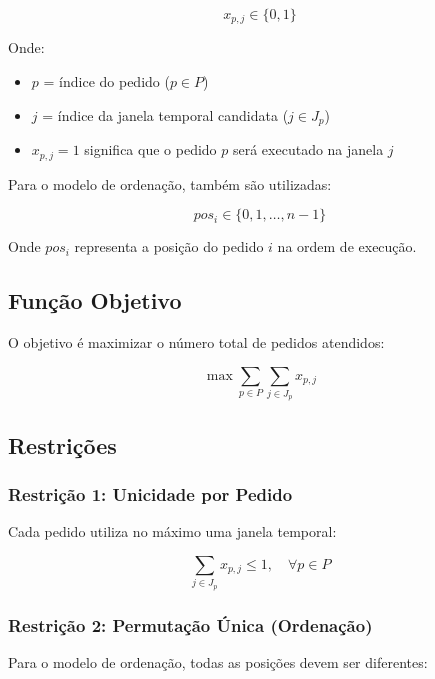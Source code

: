 \documentclass[12pt,a4paper]{article}
\begin{document}
\begin{equation}
x_{p,j} \in \{0, 1\}
\end{equation}

Onde:
\begin{itemize}
    \item $p$ = índice do pedido ($p \in P$)
    \item $j$ = índice da janela temporal candidata ($j \in J_p$)
    \item $x_{p,j} = 1$ significa que o pedido $p$ será executado na janela $j$
\end{itemize}

Para o modelo de ordenação, também são utilizadas:

\begin{equation}
pos_i \in \{0, 1, \ldots, n-1\}
\end{equation}

Onde $pos_i$ representa a posição do pedido $i$ na ordem de execução.

\subsection{Função Objetivo}

O objetivo é maximizar o número total de pedidos atendidos:

\begin{equation}
\max \sum_{p \in P} \sum_{j \in J_p} x_{p,j}
\end{equation}

\subsection{Restrições}

\subsubsection{Restrição 1: Unicidade por Pedido}

Cada pedido utiliza no máximo uma janela temporal:

\begin{equation}
\sum_{j \in J_p} x_{p,j} \leq 1, \quad \forall p \in P
\end{equation}

\subsubsection{Restrição 2: Permutação Única (Ordenação)}

Para o modelo de ordenação, todas as posições devem ser diferentes:
\end{document}
